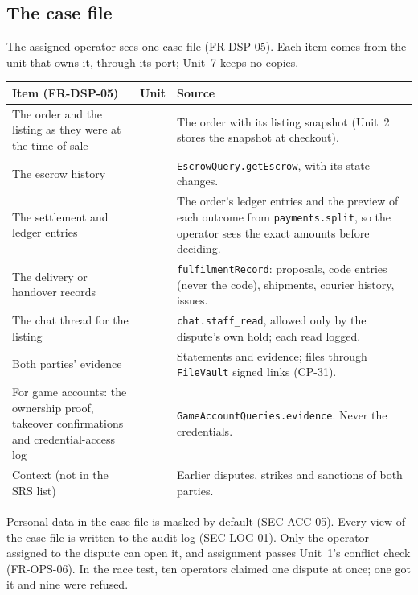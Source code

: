 \documentclass[11pt,a4paper]{article}
\newenvironment{dtable}[1]{\small\begin{longtable}{#1}}{\end{longtable}}
\begin{document}
\subsection{The case file}
\label{sec:casefile}
The assigned operator sees one case file (FR-DSP-05). Each item comes from the unit that owns it, through its port; Unit~7 keeps no copies.
\begin{dtable}{@{}>{\raggedright\arraybackslash}p{5.0cm}>{\raggedright\arraybackslash}p{3.0cm}>{\raggedright\arraybackslash}p{7.2cm}@{}}
\toprule
\textbf{Item (FR-DSP-05)} & \textbf{Unit} & \textbf{Source} \\ \midrule \endhead
The order and the listing as they were at the time of sale & 2 & The order with its listing snapshot (Unit~2 stores the snapshot at checkout). \\
The escrow history & 2 & \texttt{EscrowQuery.getEscrow}, with its state changes. \\
The settlement and ledger entries & 2 & The order's ledger entries and the preview of each outcome from \texttt{payments.split}, so the operator sees the exact amounts before deciding. \\
The delivery or handover records & 4 & \texttt{fulfilmentRecord}: proposals, code entries (never the code), shipments, courier history, issues. \\
The chat thread for the listing & 6 & \texttt{chat.staff\_read}, allowed only by the dispute's own hold; each read logged. \\
Both parties' evidence & 7 & Statements and evidence; files through \texttt{FileVault} signed links (CP-31). \\
For game accounts: the ownership proof, takeover confirmations and credential-access log & 5 & \texttt{GameAccountQueries.evidence}. Never the credentials. \\
Context (not in the SRS list) & 7 & Earlier disputes, strikes and sanctions of both parties. \\
\bottomrule
\end{dtable}
Personal data in the case file is masked by default (SEC-ACC-05). Every view of the case file is written to the audit log (SEC-LOG-01). Only the operator assigned to the dispute can open it, and assignment passes Unit~1's conflict check (FR-OPS-06). In the race test, ten operators claimed one dispute at once; one got it and nine were refused.
\end{document}
